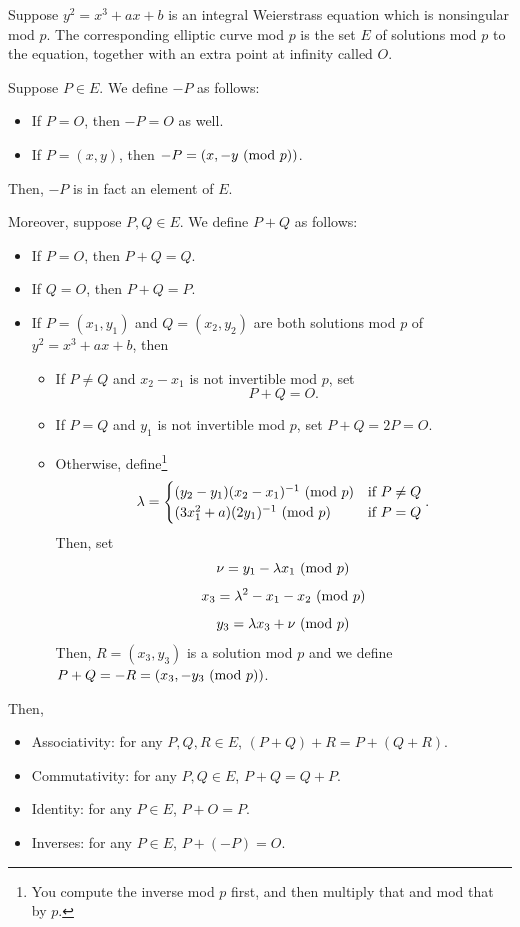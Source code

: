 \documentclass[letterpaper]{article}
\begin{document}
\begin{theorem}{}{}
    Suppose $y^2 = x^3 + ax + b$ is an integral Weierstrass equation which is nonsingular mod $p$. The corresponding elliptic curve mod $p$ is the set $E$ of solutions mod $p$ to the equation, together with an extra point at infinity called $O$. 

    \bigskip 

    Suppose $P \in E$. We define $-P$ as follows: 
    \begin{itemize}
        \item If $P = O$, then $-P = O$ as well.
        \item If $P = (x, y)$, then $-P = (x, -y \ (\mathrm{mod}\ p))$. 
    \end{itemize}
    Then, $-P$ is in fact an element of $E$. 

    \bigskip 

    Moreover, suppose $P, Q \in E$. We define $P + Q$ as follows: 
    \begin{itemize}
        \item If $P = O$, then $P + Q = Q$. 
        \item If $Q = O$, then $P + Q = P$. 
        \item If $P = (x_1, y_1)$ and $Q = (x_2, y_2)$ are both solutions mod $p$ of $y^2 = x^3 + ax + b$, then 
        \begin{itemize}
            \item If $P \neq Q$ and $x_2 - x_1$ is not invertible mod $p$, set \[P + Q = O.\]
            \item If $P = Q$ and $y_1$ is not invertible mod $p$, set $P + Q = 2P = O$. 
            \item Otherwise, define\footnote{You compute the inverse mod $p$ first, and then multiply that and mod that by $p$.}
            \[\lambda = \begin{cases}
                (y_2 - y_1)(x_2 - x_1)^{-1} \ (\mathrm{mod}\ p) & \text{if } P \neq Q \\ 
                (3x_1^2 + a)(2y_1)^{-1} \ (\mathrm{mod}\ p) & \text{if } P = Q 
            \end{cases}.\]
            Then, set 
            \[\nu = y_1 - \lambda x_1 \ (\mathrm{mod}\ p)\]
            \[x_3 = \lambda^2 - x_1 - x_2 \ (\mathrm{mod}\ p)\]
            \[y_3 = \lambda x_3 + \nu \ (\mathrm{mod}\ p)\]
            Then, $R = (x_3, y_3)$ is a solution mod $p$ and we define $P + Q = -R = (x_3, -y_3 \ (\mathrm{mod}\ p))$. 
        \end{itemize}
    \end{itemize}
    Then, 
    \begin{itemize}
        \item Associativity: for any $P, Q, R \in E$, $(P + Q) + R = P + (Q + R)$.
        \item Commutativity: for any $P, Q \in E$, $P + Q = Q + P.$
        \item Identity: for any $P \in E$, $P + O = P.$
        \item Inverses: for any $P \in E$, $P + (-P) = O.$
    \end{itemize}
\end{theorem}
\end{document}
